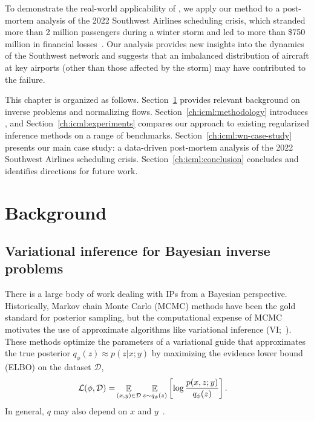 To demonstrate the real-world applicability of \ouralg{}, we apply our method to a post-mortem analysis of the 2022 Southwest Airlines scheduling crisis, which stranded more than 2 million passengers during a winter storm and led to more than \$750 million in financial losses~\cite{roseSouthwestWillPay2023}. Our analysis provides new insights into the dynamics of the Southwest network and suggests that an imbalanced distribution of aircraft at key airports (other than those affected by the storm) may have contributed to the failure.

This chapter is organized as follows. Section~\ref{ch:icml:background} provides relevant background on inverse problems and normalizing flows. Section~\ref{ch:icml:methodology} introduces \ouralg{}, and Section~\ref{ch:icml:experiments} compares our approach to existing regularized inference methods on a range of benchmarks. Section~\ref{ch:icml:wn-case-study} presents our main case study: a data-driven post-mortem analysis of the 2022 Southwest Airlines scheduling crisis. Section~\ref{ch:icml:conclusion} concludes and identifies directions for future work.

\section{Background}\label{ch:icml:background}

\subsection{Variational inference for Bayesian inverse problems}

There is a large body of work dealing with IPs from a Bayesian perspective. Historically, Markov chain Monte Carlo (MCMC) methods have been the gold standard for posterior sampling, but the computational expense of MCMC motivates the use of approximate algorithms like variational inference (VI;~\cite{stuartInverseProblemsBayesian2010}). These methods optimize the parameters of a variational guide that approximates the true posterior $q_{\phi}(z) \approx p(z | x; y)$ by maximizing the evidence lower bound (ELBO) on the dataset $\mathcal{D}$,
\begin{align}
    \mathcal{L}(\phi, \mathcal{D}) = & \mathop{\mathbb{E}}_{(x, y) \in \mathcal{D}} \mathop{\mathbb{E}}_{z\sim q_{\phi}(z)}\left[ \log \frac{p(x, z; y)}{q_\phi (z)} \right]. \label{ch:icml:eq:elbo}
\end{align}
In general, $q$ may also depend on $x$ and $y$~\cite{kingmaAutoEncodingVariationalBayes2014}.

